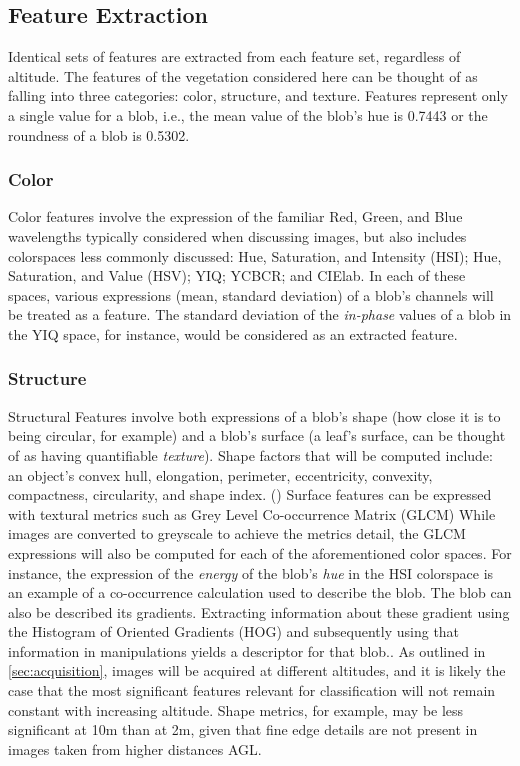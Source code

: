 \documentclass[12pt]{article}
\begin{document}
\subsection{Feature Extraction}
Identical sets of features are extracted from each feature set, regardless of altitude. The features of the vegetation considered here can be thought of as falling into three categories: color, structure, and texture.  Features represent only a single value for a blob, i.e., the mean value of the blob's hue is 0.7443 or the roundness of a blob is 0.5302.
\subsubsection{Color}
Color features involve the expression of the familiar Red, Green, and Blue wavelengths typically considered when discussing images, but also includes colorspaces less commonly discussed: Hue, Saturation, and Intensity (HSI); Hue, Saturation, and Value (HSV); YIQ; YCBCR; and CIElab. In each of these spaces, various expressions (mean, standard deviation) of a blob's channels will be treated as a feature. The standard deviation of the \textit{in-phase} values of a blob in the YIQ space, for instance, would be considered as an extracted feature.
\subsubsection{Structure}
Structural Features involve both expressions of a blob's shape (how close it is to being circular, for example) and a blob's surface (a leaf's surface, can be thought of as having quantifiable \textit{texture}).  Shape factors that will be computed include: an object's convex hull, elongation, perimeter, eccentricity, convexity, compactness, circularity, and shape index. (\cite{Lin2017-xq, Wirth2004-li}) Surface features can be expressed with textural metrics such as Grey Level Co-occurrence Matrix (GLCM) \parencite{Haralick1973-gr, Hall-Beyer2017-nx} While images are converted to greyscale to achieve the metrics \citeauthor{Haralick1973-gr} detail, the GLCM expressions will also be computed for each of the aforementioned color spaces. For instance, the expression of the \textit{energy} of the blob's \textit{hue} in the HSI colorspace is an example of a co-occurrence calculation used to describe the blob. The blob can also be described its gradients. Extracting information about these gradient using the Histogram of Oriented Gradients (HOG) and subsequently using that information in manipulations yields a descriptor for that blob.\parencite{Abouzahir2021-sd}. As outlined in \ref{sec:acquisition}, images will be acquired at different altitudes, and it is likely the case that the most significant features relevant for classification will not remain constant with increasing altitude. Shape metrics, for example, may be less significant at 10m than at 2m, given that fine edge details are not present in images taken from higher distances AGL.
\end{document}
